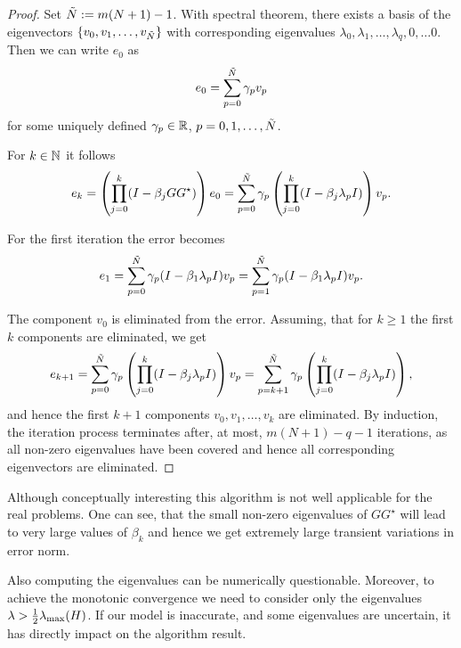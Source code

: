 \begin{proof} 
	Set $\tilde{N} := m(N+1) - 1$. With spectral theorem, there exists a basis of the eigenvectors $\{v_0, v_1, \dots, v_{\tilde{N}}\}$ with corresponding eigenvalues $\lambda_0, \lambda_1, \dots, \lambda_q, 0, \dots 0$. 
	Then we can write $e_0$ as 
	\begin{align}
	e_0 = \sum_{p = 0}^{\tilde{N}} \gamma_p v_p
	\end{align}
	for some uniquely defined $\gamma_p \in {\mathbb{R}}$, $p = 0, 1, \dots, \tilde{N}$. 
	
	For $k \in {\mathbb{N}}$ it follows 
	\begin{align}
	e_k = \left(\prod_{j=0}^k(I - \beta_j G G^\star)\right)e_0 = \sum_{p = 0}^{\tilde{N}} \gamma_p \left(\prod_{j=0}^k (I - \beta_j \lambda_p I)\right)v_p.
	\end{align}
	
	For the first iteration the error becomes 
	\begin{align}
	e_1 = \sum_{p = 0}^{\tilde{N}} \gamma_p ( I - \beta_1 \lambda_p I) v_p = \sum_{p=1}^{\tilde{N} } \gamma_p ( I - \beta_1 \lambda_p I) v_p.
	\end{align}
	
	The component $v_0$ is eliminated from the error.
	Assuming, that for $k \geq 1$ the first $k$ components are eliminated, we get 
	\begin{align}
	e_{k+1} = \sum_{p = 0}^{\tilde{N}} \gamma_p \left(\prod_{j=0}^k (I - \beta_j \lambda_p I)\right)v_p = \sum_{p = k + 1}^{\tilde{N}} \gamma_p \left(\prod_{j = 0}^k (I - \beta_j \lambda_p I )\right),
	\end{align}
	and hence the first $k+1$ components $v_0, v_1, \dots, v_k$ are eliminated. 
	By induction, the iteration process terminates after, at most,  $m(N+1) - q - 1$ iterations, as all non-zero eigenvalues have been covered and hence all corresponding eigenvectors are eliminated.	
\end{proof}

Although conceptually interesting this algorithm is not well applicable for the real problems. One can see, that the small non-zero eigenvalues of $GG^\star$ will lead to very large values of $\beta_k$ and hence we get extremely large transient variations in error norm. 

Also computing the eigenvalues can be numerically questionable. Moreover, to achieve the monotonic convergence we need to consider only the eigenvalues $\lambda > \frac{1}{2}\lambda_{\mathrm{max}}(H)$.
If our model is inaccurate, and some eigenvalues are uncertain, it has directly impact on the algorithm result. 

